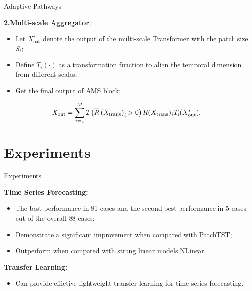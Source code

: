 \documentclass[12pt,aspectratio=169]{beamer}
\begin{document}
\begin{frame}{Adaptive Pathways}

  \textbf{2.Multi-scale Aggregator.}

  \begin{itemize}

    \item Let $X_\mathrm{out}^i$ denote the output of the multi-scale Transformer
    with the patch size $S_i$;

    \item Define $T_i(\cdot)$ as a transformation function to align the temporal 
    dimension from different scales;

    \item Get the final output of AMS block:

  \end{itemize}

  \vspace{-0.7cm}

  {

    \color{ECNURed}
    $$X_\mathrm{out}=\sum_{i=1}^M {\cal I}\left(\overline{R}
    \left(X_\mathrm{trans}\right)_i>0\right)R(X_\mathrm{trans})_i
    T_i(X_\mathrm{out}^i).$$

  }

\end{frame}

\section{Experiments}

\begin{frame}{Experiments}

  \textbf{Time Series Forecasting:}

  \begin{itemize}

    \item The best performance in 81 cases and the second-best performance in 5
    cases out of the overall 88 cases;

    \item Demonstrate a significant improvement when compared with PatchTST;

    \item Outperform when compared with strong linear models NLinear.

  \end{itemize}

  \textbf{Transfer Learning:}

  \begin{itemize}

    \item Can provide effictive lightweight transfer learning for time series 
    forecasting.

  \end{itemize}

\end{frame}
\end{document}
